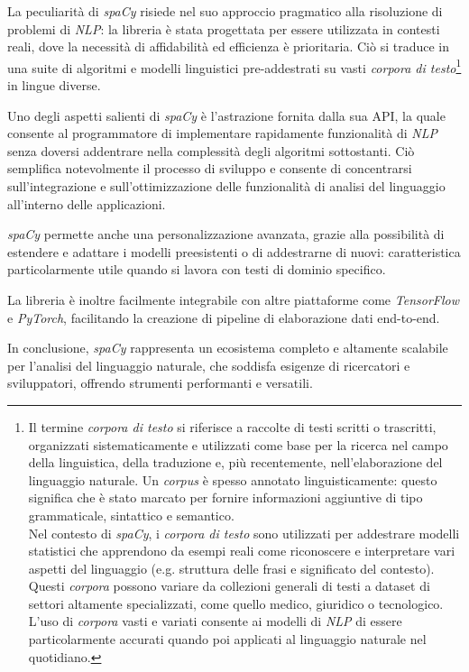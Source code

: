 \documentclass[12pt]{report}
\newcommand{\spacy}{\textsl{spaCy}\xspace}
\newcommand{\nlp}{\textsl{NLP}\xspace}
\newcommand{\api}{\textsf{API}\xspace}
\begin{document}
La peculiarità di \spacy risiede nel suo approccio pragmatico alla risoluzione di problemi di \nlp: la libreria è stata progettata per essere utilizzata in contesti reali, dove la necessità di affidabilità ed efficienza è prioritaria. Ciò si traduce in una suite di algoritmi e modelli linguistici pre-addestrati su vasti \textit{corpora di testo}\footnote{Il termine \textit{corpora di testo} si riferisce a raccolte di testi scritti o trascritti, organizzati sistematicamente e utilizzati come base per la ricerca nel campo della linguistica, della traduzione e, più recentemente, nell'elaborazione del linguaggio naturale. Un \textit{corpus} è spesso annotato linguisticamente: questo significa che è stato marcato per fornire informazioni aggiuntive di tipo grammaticale, sintattico e semantico.\\
Nel contesto di \spacy, i \textit{corpora di testo} sono utilizzati per addestrare modelli statistici che apprendono da esempi reali come riconoscere e interpretare vari aspetti del linguaggio (e.g. struttura delle frasi e significato del contesto). Questi \textit{corpora} possono variare da collezioni generali di testi a dataset di settori altamente specializzati, come quello medico, giuridico o tecnologico. L'uso di \textit{corpora} vasti e variati consente ai modelli di \nlp di essere particolarmente accurati quando poi applicati al linguaggio naturale nel quotidiano.} in lingue diverse.

Uno degli aspetti salienti di \spacy è l'astrazione fornita dalla sua \api, la quale consente al programmatore di implementare rapidamente funzionalità di \nlp senza doversi addentrare nella complessità degli algoritmi sottostanti. Ciò semplifica notevolmente il processo di sviluppo e consente di concentrarsi sull'integrazione e sull'ottimizzazione delle funzionalità di analisi del linguaggio all'interno delle applicazioni.

\spacy permette anche una personalizzazione avanzata, grazie alla possibilità di estendere e adattare i modelli preesistenti o di addestrarne di nuovi: caratteristica particolarmente utile quando si lavora con testi di dominio specifico.

La libreria è inoltre facilmente integrabile con altre piattaforme come \textsl{TensorFlow} e \textsl{PyTorch}, facilitando la creazione di pipeline di elaborazione dati end-to-end.

In conclusione, \spacy rappresenta un ecosistema completo e altamente scalabile per l'analisi del linguaggio naturale, che soddisfa esigenze di ricercatori e sviluppatori, offrendo strumenti performanti e versatili.
\end{document}
